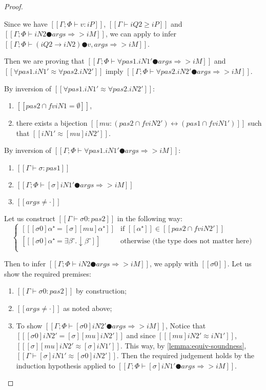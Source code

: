 \begin{proof}
\begin{caseof}
            Since we have $[[Γ ; Φ ⊢ v : iP]]$, $[[Γ ⊢ iQ2 ≥ iP]]$ and 
            $[[Γ ; Φ ⊢ iN2 ● args ⇒> iM]]$, we can apply 
            to infer $[[Γ; Φ ⊢ (iQ2 → iN2) ● v, args ⇒> iM]]$.

        \item {}
            Then we are proving that 
            $[[Γ ; Φ ⊢ ∀pas1.iN1' ● args ⇒> iM]]$ and $[[∀pas1.iN1' ≈ ∀pas2.iN2']]$
            imply $[[Γ ; Φ ⊢ ∀pas2.iN2' ● args ⇒> iM]]$.


            By inversion of $[[∀pas1.iN1' ≈ ∀pas2.iN2']]$:
            \begin{enumerate}
                \item $[[{pas2} ∩ fv iN1 = ∅]]$,
                \item there exists a bijection 
                    $[[mu : ({pas2} ∩ fv iN2') ↔ ({pas1} ∩ fv iN1')]]$
                    such that $[[iN1' ≈ [mu] iN2']]$.
            \end{enumerate}

            By inversion of $[[Γ ; Φ ⊢ ∀pas1.iN1' ● args ⇒> iM]]$:
            \begin{enumerate}
                \item $[[Γ ⊢ σ : pas1]]$        
                \item $[[Γ ; Φ ⊢ [σ]iN1' ● args ⇒> iM]]$
                \item $[[args ≠ ·]]$
            \end{enumerate}

            Let us construct $[[Γ ⊢ σ0 : pas2]]$ in the following way:
            $$
            \begin{cases}
                [[ [σ0]α⁺ =  [σ][mu]α⁺ ]] & \text{if } [[α⁺]] \in [[ {pas2} ∩ fv iN2' ]] \\
                [[ [σ0]α⁺ =  ∃β⁻.↓β⁻ ]] & \text{otherwise (the type does not matter here)} \\
            \end{cases}
            $$

            Then to infer $[[Γ ; Φ ⊢ iN2 ● args ⇒> iM]]$, we 
            apply  with $[[σ0]]$. 
            Let us show the required premises:
            \begin{enumerate}
                \item $[[Γ ⊢ σ0 : pas2]]$ by construction;
                \item $[[args ≠ ·]]$ as noted above;
                \item To show $[[Γ ; Φ ⊢ [σ0]iN2' ● args ⇒> iM]]$,
                Notice that $[[ [σ0]iN2' = [σ][mu]iN2' ]]$   
                and since $[[ [mu]iN2' ≈ iN1' ]]$, $[[ [σ][mu]iN2' ≈ [σ]iN1' ]]$.
                This way, by \cref{lemma:equiv-soundness}, $[[Γ ⊢ [σ]iN1' ≈ [σ0]iN2']]$.
                Then the required judgement holds by the induction hypothesis
                applied to $[[Γ ; Φ ⊢ [σ]iN1' ● args ⇒> iM]]$.
            \end{enumerate}
    \end{caseof}
\end{proof}

